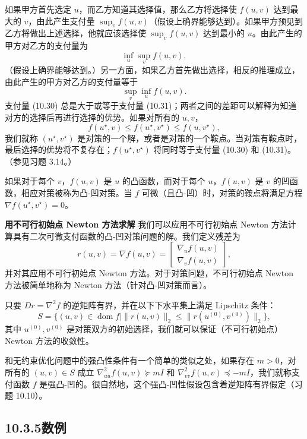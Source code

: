 \documentclass[UTF8,12pt,a4paper,fontset=fandol]{ctexart}
\begin{document}
如果甲方首先选定 $u$，而乙方知道其选择值，那么乙方将选择使 $f(u,v)$ 达到最大的 $v$，由此产生支付量 $\sup_v f(u,v)$（假设上确界能够达到）。如果甲方预见到乙方将做出上述选择，他就应该选择使 $\sup_v f(u,v)$ 达到最小的 $u$。由此产生的甲方对乙方的支付量为
\begin{equation}
\inf_u\sup_v f(u,v),
\tag{10.30}
\end{equation}
（假设上确界能够达到。）另一方面，如果乙方首先做出选择，相反的推理成立，由此产生的甲方对乙方的支付量等于
\begin{equation}
\sup_v\inf_u f(u,v).
\tag{10.31}
\end{equation}
支付量 (10.30) 总是大于或等于支付量 (10.31)；两者之间的差距可以解释为知道对方的选择后再进行选择的优势。如果对所有的 $u,v$，
\[
f(u^\star,v)\leq f(u^\star,v^\star)\leq f(u,v^\star),
\]
我们就称 $(u^\star,v^\star)$ 是对策的一个解，或者是对策的一个鞍点。当对策有鞍点时，最后选择的优势将不复存在；$f(u^\star,v^\star)$ 将同时等于支付量 (10.30) 和 (10.31)。（参见习题 3.14。）

如果对于每个 $v$，$f(u,v)$ 是 $u$ 的凸函数，而对于每个 $u$，$f(u,v)$ 是 $v$ 的凹函数，相应对策被称为凸-凹对策。当 $f$ 可微（且凸-凹）时，对策的鞍点将满足方程 $\nabla f(u^\star,v^\star)=0$。

\noindent\textbf{用不可行初始点 Newton 方法求解}\quad
我们可以应用不可行初始点 Newton 方法计算具有二次可微支付函数的凸-凹对策问题的解。我们定义残差为
\[
r(u,v)=\nabla f(u,v)=
\begin{bmatrix}
\nabla_u f(u,v)\\
\nabla_v f(u,v)
\end{bmatrix},
\]
并对其应用不可行初始点 Newton 方法。对于对策问题，不可行初始点 Newton 方法被简单地称为 Newton 方法（针对凸-凹对策而言）。

只要 $Dr=\nabla^2 f$ 的逆矩阵有界，并在以下下水平集上满足 Lipschitz 条件：
\[
S=\{(u,v)\in\operatorname{dom} f\mid \|r(u,v)\|_2\leq \|r(u^{(0)},v^{(0)})\|_2\},
\]
其中 $u^{(0)},v^{(0)}$ 是对策双方的初始选择，我们就可以保证（不可行初始点）Newton 方法的收敛性。

和无约束优化问题中的强凸性条件有一个简单的类似之处，如果存在 $m>0$，对所有的 $(u,v)\in S$ 成立 $\nabla^2_{uu}f(u,v)\succeq mI$ 和 $\nabla^2_{vv}f(u,v)\preceq -mI$，我们就称支付函数 $f$ 是强凸-凹的。很自然地，这个强凸-凹性假设包含着逆矩阵有界假定（习题 10.10）。

\subsection*{10.3.5\quad 数例}
\end{document}
